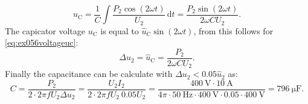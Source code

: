 \begin{solutionblock}
    \begin{equation}
        u_\mathrm{C} = \frac{1}{C} \int \frac{P_\mathrm{2}\cos(2\omega t)}{U_\mathrm{2}} \, \mathrm{d}t = \frac{P_\mathrm{2}\sin(2\omega t)}{2\omega C U_\mathrm{2}}.\label{eq:ex056voltageuc}
    \end{equation}
    The capicator voltage $u_\mathrm{C}$ is equal to $ \hat u_\mathrm{C} \sin(2\omega t)$, from this follows for \eqref{eq:ex056voltageuc}:
    \begin{equation}
       \Delta u_\mathrm{2}= \hat u_\mathrm{C} = \frac{P_\mathrm{2}}{2\omega C U_\mathrm{2}}.
    \end{equation}
    Finally the capacitance can be calculate with $\Delta u_{\mathrm{2}}<0.05  \hat u_{\mathrm{2}}$ as:
    \begin{equation}
        C = \frac{P_\mathrm{2}}{2\cdot 2\pi f  U_\mathrm{2}  \Delta u_\mathrm{2} }= \frac{U_\mathrm{2}I_\mathrm{2}}{2\cdot 2\pi f  U_\mathrm{2}\  0.05 U_\mathrm{2}} = \frac{\SI{400}{\volt}\cdot \SI{10}{\ampere}}{4 \pi \cdot\SI{50}{\hertz}\cdot\SI{400}{\volt}\cdot 0.05 \cdot \SI{400}{\volt}} = \SI{796}{\micro\farad}.  
    \end{equation}
    \end{solutionblock}
